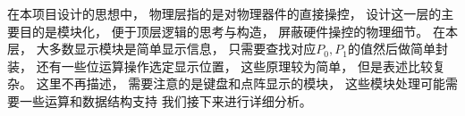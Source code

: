 \documentclass[../main.tex]{subfiles} %
\begin{document}
在本项目设计的思想中，
物理层指的是对物理器件的直接操控，
设计这一层的主要目的是模块化，
便于顶层逻辑的思考与构造，
屏蔽硬件操控的物理细节。
在本层，
大多数显示模块是简单显示信息，
只需要查找对应$P_0,P_1$的值然后做简单封装，
还有一些位运算操作选定显示位置，
这些原理较为简单，
但是表述比较复杂。
这里不再描述，
需要注意的是键盘和点阵显示的模块，
这些模块处理可能需要一些运算和数据结构支持
我们接下来进行详细分析。
\end{document}
